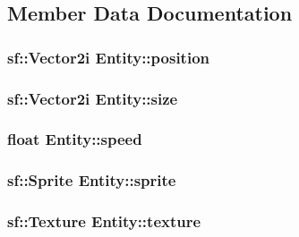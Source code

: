 \subsection{Member Data Documentation}
\hypertarget{class_entity_aa58364f83a24774ad8d29e2f5e48e06d}{
\subsubsection[{position}]{\setlength{\rightskip}{0pt plus 5cm}sf\+::\+Vector2i Entity\+::position\hspace{0.3cm}{\ttfamily [protected]}}}\label{class_entity_aa58364f83a24774ad8d29e2f5e48e06d}
\hypertarget{class_entity_ae32cdf24e4f89bee02c7132c4d6e9c18}{
\subsubsection[{size}]{\setlength{\rightskip}{0pt plus 5cm}sf\+::\+Vector2i Entity\+::size\hspace{0.3cm}{\ttfamily [protected]}}}\label{class_entity_ae32cdf24e4f89bee02c7132c4d6e9c18}
\hypertarget{class_entity_a1de3d8d9ab8088f61e6726069b26fa60}{
\subsubsection[{speed}]{\setlength{\rightskip}{0pt plus 5cm}float Entity\+::speed\hspace{0.3cm}{\ttfamily [protected]}}}\label{class_entity_a1de3d8d9ab8088f61e6726069b26fa60}
\hypertarget{class_entity_a48ef4ab143b8d0211877c9f6be42e824}{
\subsubsection[{sprite}]{\setlength{\rightskip}{0pt plus 5cm}sf\+::\+Sprite Entity\+::sprite\hspace{0.3cm}{\ttfamily [protected]}}}\label{class_entity_a48ef4ab143b8d0211877c9f6be42e824}
\hypertarget{class_entity_ad64dd6d282432a68475f30f7c7bbdc88}{
\subsubsection[{texture}]{\setlength{\rightskip}{0pt plus 5cm}sf\+::\+Texture Entity\+::texture\hspace{0.3cm}{\ttfamily [protected]}}}\label{class_entity_ad64dd6d282432a68475f30f7c7bbdc88}
